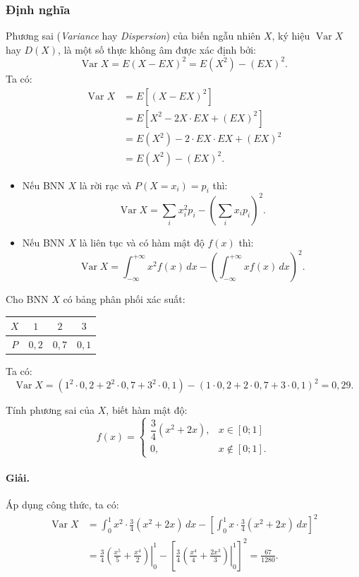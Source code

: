 \subsubsection{Định nghĩa}
Phương sai (\textit{Variance} hay \textit{Dispersion}) của biến ngẫu nhiên $X$, ký hiệu $\operatorname{Var} X$ hay $D(X)$, là một số thực không âm được xác định bởi:
\[
\operatorname{Var} X = E(X - EX)^2 = E(X^2) - (EX)^2.
\]
Ta có:
\begin{align*}
\operatorname{Var} X &= E\left[(X - EX)^2\right] \\
&= E\left[X^2 - 2X \cdot EX + (EX)^2\right] \\
&= E(X^2) - 2 \cdot EX \cdot EX + (EX)^2 \\
&= E(X^2) - (EX)^2.
\end{align*}

\begin{itemize}
    \item Nếu BNN $X$ là rời rạc và $P(X = x_i) = p_i$ thì:
    \[
    \operatorname{Var} X = \sum_i x_i^2 p_i - \left(\sum_i x_i p_i\right)^2.
    \]
    \item Nếu BNN $X$ là liên tục và có hàm mật độ $f(x)$ thì:
    \[
    \operatorname{Var} X = \int_{-\infty}^{+\infty} x^2 f(x)\,dx - \left(\int_{-\infty}^{+\infty} x f(x)\,dx\right)^2.
    \]
\end{itemize}

\begin{vidu}[VD 15]
Cho BNN $X$ có bảng phân phối xác suất:
\begin{center}
\begin{tabular}{|c|c|c|c|}
\hline
$X$ & $1$ & $2$ & $3$ \\
\hline
$P$ & $0{,}2$ & $0{,}7$ & $0{,}1$ \\
\hline
\end{tabular}
\end{center}
Ta có:
\[
\operatorname{Var} X = (1^2 \cdot 0{,}2 + 2^2 \cdot 0{,}7 + 3^2 \cdot 0{,}1) - (1 \cdot 0{,}2 + 2 \cdot 0{,}7 + 3 \cdot 0{,}1)^2 = 0{,}29.
\]
\end{vidu}

\begin{vidu}[VD 16]
Tính phương sai của $X$, biết hàm mật độ:
\[
f(x) = \begin{cases}
\dfrac{3}{4}(x^2 + 2x), & x \in [0; 1] \\
0, & x \notin [0; 1].
\end{cases}
\]

\paragraph{Giải.} Áp dụng công thức, ta có:
\begin{align*}
\operatorname{Var} X &= \int_0^1 x^2 \cdot \frac{3}{4}(x^2 + 2x)\,dx - \left[\int_0^1 x \cdot \frac{3}{4}(x^2 + 2x)\,dx\right]^2 \\
&= \frac{3}{4} \left.\left(\frac{x^5}{5} + \frac{x^4}{2}\right)\right|_0^1 - \left[\frac{3}{4} \left.\left(\frac{x^4}{4} + \frac{2x^3}{3}\right)\right|_0^1\right]^2 = \frac{67}{1280}.
\end{align*}
\end{vidu}

